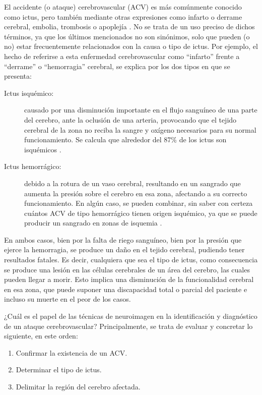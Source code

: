El accidente (o ataque) cerebrovascular (ACV) es más comúnmente conocido como ictus, pero también mediante otras expresiones como infarto o derrame cerebral, embolia, trombosis o apoplejía \cite{wiki:acv}. No se trata de un uso preciso de dichos términos, ya que los últimos mencionados no son sinónimos, solo que pueden (o no) estar frecuentemente relacionados con la causa o tipo de ictus. Por ejemplo, el hecho de referirse a esta enfermedad cerebrovascular como ``infarto'' frente a ``derrame'' o ``hemorragia'' cerebral, se explica por los dos tipos en que se presenta:
\begin{description}
	\item [Ictus isquémico:] causado por una disminución importante en el flujo sanguíneo de una parte del cerebro, ante la oclusión de una arteria, provocando que el tejido cerebral de la zona no reciba la sangre y oxígeno necesarios para su normal funcionamiento. Se calcula que alrededor del 87\% de los ictus son isquémicos \cite{wiki:stroke}.	
	
	\item [Ictus hemorrágico:] debido a la rotura de un vaso cerebral, resultando en un sangrado que aumenta la presión sobre el cerebro en esa zona, afectando a su correcto funcionamiento. En algún caso, se pueden combinar, sin saber con certeza cuántos ACV de tipo hemorrágico tienen origen isquémico, ya que se puede producir un sangrado en zonas de isquemia \cite{wiki:stroke}.
\end{description}

En ambos casos, bien por la falta de riego sanguíneo, bien por la presión que ejerce la hemorragia, se produce un daño en el tejido cerebral, pudiendo tener resultados fatales. Es decir, cualquiera que sea el tipo de ictus, como consecuencia se produce una lesión en las células cerebrales de un área del cerebro, las cuales pueden llegar a morir. Esto implica una disminución de la funcionalidad cerebral en esa zona, que puede suponer una discapacidad total o parcial del paciente e incluso su muerte en el peor de los casos.

¿Cuál es el papel de las técnicas de neuroimagen en la identificación y diagnóstico de un ataque cerebrovascular? Principalmente, se trata de evaluar y concretar lo siguiente, en este orden:

\begin{enumerate}
	\item Confirmar la existencia de un ACV.
	\item Determinar el tipo de ictus.
	\item Delimitar la región del cerebro afectada.
\end{enumerate} 


